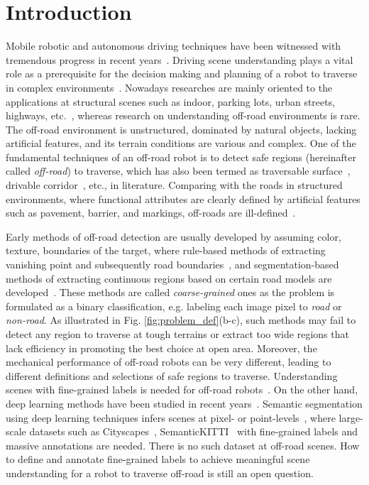 \documentclass[letterpaper, 10 pt, conference]{ieeeconf}  %
\begin{document}
	\section{Introduction}
	Mobile robotic and autonomous driving techniques have been witnessed with tremendous progress in recent years~\cite{feng2020deep}. Driving scene understanding plays a vital role as a prerequisite for the decision making and planning of a robot to traverse in complex environments~\cite{badue2020self}.
	Nowadays researches are mainly oriented to the applications at structural scenes such as indoor, parking lots, urban streets, highways, etc.~\cite{siam2017deep},
	whereas research on understanding off-road environments is rare.
	The off-road environment is unstructured, dominated by natural objects, lacking artificial features, and its terrain conditions are various and complex.
	One of the fundamental techniques of an off-road robot is to detect safe regions (hereinafter called {\it off-road}) to traverse, which has also been termed as traversable surface~\cite{zhou2012self}, drivable corridor~\cite{nefian2006detection}, etc., in literature.
	Comparing with the roads in structured environments, where functional attributes are clearly defined by artificial features such as pavement, barrier, and markings,
	off-roads are ill-defined~\cite{ososinski2015automatic}. 
	
	Early methods of off-road detection are usually developed by assuming color, texture, boundaries of the target, where rule-based methods of extracting vanishing point and subsequently road boundaries~\cite{kong2009vanishing}\cite{shi2015fast}, and segmentation-based methods of extracting continuous regions based on certain road models are developed~\cite{alon2006off}\cite{wang2009unstructured}.
	These methods are called {\it coarse-grained} ones as the problem is formulated as a binary classification, e.g. labeling each image pixel to {\it road} or {\it non-road}.
	As illustrated in Fig. \ref{fig:problem_def}(b-c), such methods may fail to detect any region to traverse at tough terrains or extract too wide regions that lack efficiency in promoting the best choice at open area.
	Moreover, the mechanical performance of off-road robots can be very different, leading to different definitions and selections of safe regions to traverse.
	Understanding scenes with fine-grained labels is needed for off-road robots~\cite{wellhausen2019should}.
	On the other hand, deep learning methods have been studied in recent years~\cite{rateke2019passive}. 
	Semantic segmentation using deep learning techniques infers scenes at pixel- or point-levels~\cite{long2015fully}, where large-scale datasets such as Cityscapes~\cite{cordts2016cityscapes}, SemanticKITTI~\cite{behley2019semantickitti} with fine-grained labels and massive annotations are needed.
	There is no such dataset at off-road scenes. How to define and annotate fine-grained labels to achieve meaningful scene understanding for a robot to traverse off-road is still an open question.  
	
\end{document}
